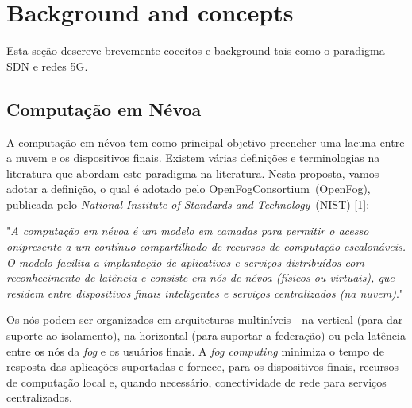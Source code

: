 \clearpage
\section{Background and concepts}
\label{ch:background}

Esta seção descreve brevemente coceitos e background tais como o paradigma SDN e redes 5G.

\subsection{Computação em Névoa}

A computação em névoa tem como principal objetivo preencher uma lacuna entre a nuvem e os dispositivos finais. Existem várias definições e terminologias na literatura que abordam este paradigma na literatura. Nesta proposta, vamos adotar a definição, o qual é adotado pelo OpenFogConsortium~(OpenFog), publicada pelo \textit{National Institute of Standards and Technology}~(NIST) [1]: 

\begin{displayquote}

"\textit{A computação em névoa é um modelo em camadas para permitir o acesso onipresente a um contínuo compartilhado de recursos de computação escalonáveis. O modelo facilita a implantação de aplicativos e serviços distribuídos com reconhecimento de latência e consiste em nós de névoa (físicos ou virtuais), que residem entre dispositivos finais inteligentes e serviços centralizados (na nuvem)}."

\end{displayquote}

Os nós podem ser organizados em arquiteturas multiníveis - na vertical (para dar suporte ao isolamento), na horizontal (para suportar a federação) ou pela latência entre os nós da \textit{fog} e os usuários finais. A \textit{fog computing} minimiza o tempo de resposta das aplicações suportadas e fornece, para os dispositivos finais, recursos de computação local e, quando necessário, conectividade de rede para serviços centralizados. %

